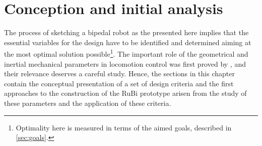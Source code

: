 \chapter{Conception and initial analysis} %
\label{cha:analysis}
The process of sketching a bipedal robot as the presented here implies that the essential variables for the design have to be identified and determined aiming at the most optimal solution possible\footnote{Optimality here is measured in terms of the aimed goals, described in \ref{sec:goals}.}.
The important role of the geometrical and inertial mechanical parameters in locomotion control was first proved by \cite{passive_walking}, and their relevance deserves a careful study.
Hence, the sections in this chapter contain the conceptual presentation of a set of design criteria and the first approaches to the construction of the RuBi prototype arisen from the study of these parameters and the application of these criteria.






